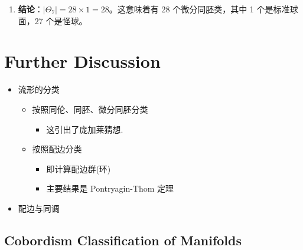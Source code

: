 \documentclass[
]{ctexart}
\providecommand{\tightlist}{%
  \setlength{\itemsep}{0pt}\setlength{\parskip}{0pt}}
\begin{document}
\begin{itemize}
\begin{enumerate}
    \begin{itemize}
    \tightlist
    \item
      查阅同伦群表，\(\Pi_7 \cong \mathbb{Z}_{240}\)。
    \item
      \(J_7\) 的阶数由 \(\text{denominator}(B_{2k}/4k)\) 决定（其中
      \(n=4k-1\)，即 \(k=2\)）。\(B_4 = \frac{1}{30}\)，所以
      \(\frac{B_4}{8} = \frac{1}{240}\)，分母是 240，因此
      \(|J_7| = 240\)。由于 \(\Pi_7 \cong \mathbb{Z}_{240}\)，故
      \(\Pi_7 = J_7\)，即 \(\Pi_7/J_7\) 是平凡群。
    \item
      可以看到对于 \(n=7\)，\(|\Theta_7|\) 对应的值就是
      \(b_2 = 28\)。这意味着对于 \(n=7\)，\(\Pi_7/J_7\) 是平凡的（或者说
      \(\Pi_7 = J_7\)）。
    \end{itemize}
  \item
    \textbf{结论}：\(|\Theta_7| = 28 \times 1 = 28\)。这意味着有 28
    个微分同胚类，其中 1 个是标准球面，27 个是怪球。
  \end{enumerate}
\end{itemize}

\section{Further Discussion}\label{further-discussion}

\begin{itemize}
\tightlist
\item
  流形的分类

  \begin{itemize}
  \tightlist
  \item
    按照同伦、同胚、微分同胚分类

    \begin{itemize}
    \tightlist
    \item
      这引出了庞加莱猜想.
    \end{itemize}
  \item
    按照配边分类

    \begin{itemize}
    \tightlist
    \item
      即计算配边群(环)
    \item
      主要结果是 Pontryagin-Thom 定理
    \end{itemize}
  \end{itemize}
\item
  配边与同调
\end{itemize}

\subsection{Cobordism Classification of
Manifolds}\label{cobordism-classification-of-manifolds}
\end{document}
